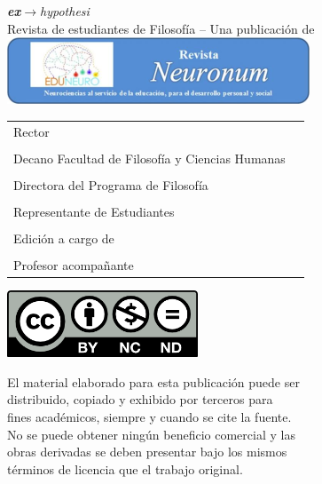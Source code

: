{\small

\begin{center}
	{\Huge\textit{\textcolor{ehAzul1}{\textbf{ex}}\textcolor{ehAzul2}{$\rightarrow$}\textcolor{ehAzul1}{\vspace{-0.4cm}hypothesi}}}\\[0.5cm]
	Revista de estudiantes de Filosofía -- Una publicación de
	\includegraphics[width=9.021cm,height=1.984cm]{img/logo-neuronum.png}
\end{center}

\begin{longtable}[]{@{}ll@{}}
	\toprule
	\midrule
	\endhead
	Rector & \rector{}\tabularnewline
	&\tabularnewline
	Decano Facultad de Filosofía y Ciencias Humanas & \decano{}\tabularnewline
	&\tabularnewline
	Directora del Programa de Filosofía & \director{}\tabularnewline
	&\tabularnewline
	Representante de Estudiantes & \representante{}\tabularnewline
	&\tabularnewline
	Edición a cargo de & \editores{}\tabularnewline
	&\tabularnewline
	Profesor acompañante & \profesores{}\tabularnewline
	\bottomrule
\end{longtable}

\newpage

\begin{center}
	\includegraphics[width=2.24419in,height=0.78333in]{img/CC-BY-NC-ND.png}
\end{center}

\begin{flushleft}

El material elaborado para esta publicación puede ser\\
distribuido, copiado y exhibido por terceros para\\
fines académicos, siempre y cuando se cite la fuente.\\
No se puede obtener ningún beneficio comercial y las\\
obras derivadas se deben presentar bajo los mismos\\
términos de licencia que el trabajo original.


\end{flushleft}}
